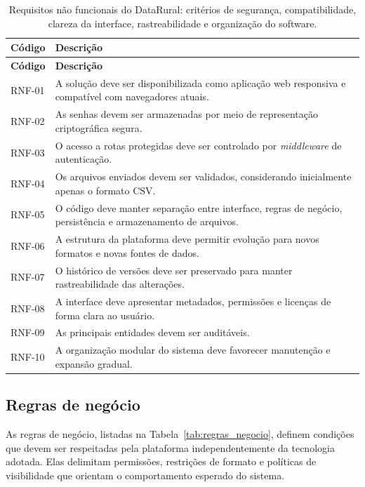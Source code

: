 \begin{longtable}{p{}p{}}
\caption{Requisitos não funcionais do DataRural: critérios de segurança, compatibilidade, clareza da interface, rastreabilidade e organização do software.}\label{tab:requisitos_nao_funcionais}\\
\toprule
\textbf{Código} & \textbf{Descrição} \\
\midrule
\endfirsthead
\toprule
\textbf{Código} & \textbf{Descrição} \\
\midrule
\endhead
RNF-01 & A solução deve ser disponibilizada como aplicação web responsiva e compatível com navegadores atuais. \\
RNF-02 & As senhas devem ser armazenadas por meio de representação criptográfica segura. \\
RNF-03 & O acesso a rotas protegidas deve ser controlado por \textit{middleware} de autenticação. \\
RNF-04 & Os arquivos enviados devem ser validados, considerando inicialmente apenas o formato CSV. \\
RNF-05 & O código deve manter separação entre interface, regras de negócio, persistência e armazenamento de arquivos. \\
RNF-06 & A estrutura da plataforma deve permitir evolução para novos formatos e novas fontes de dados. \\
RNF-07 & O histórico de versões deve ser preservado para manter rastreabilidade das alterações. \\
RNF-08 & A interface deve apresentar metadados, permissões e licenças de forma clara ao usuário. \\
RNF-09 & As principais entidades devem ser auditáveis. \\
RNF-10 & A organização modular do sistema deve favorecer manutenção e expansão gradual. \\
\bottomrule
\end{longtable}

\subsection{Regras de negócio}

As regras de negócio, listadas na Tabela~\ref{tab:regras_negocio}, definem condições que devem ser respeitadas pela plataforma independentemente da tecnologia adotada. Elas delimitam permissões, restrições de formato e políticas de visibilidade que orientam o comportamento esperado do sistema.

